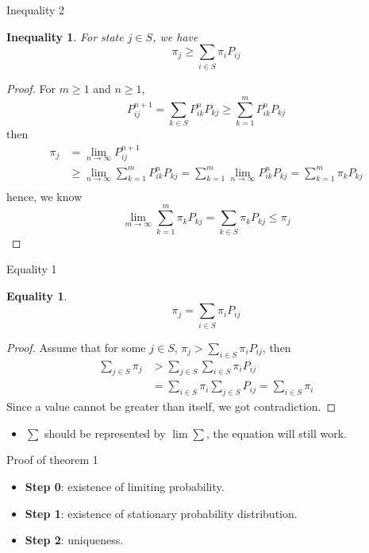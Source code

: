 \documentclass{beamer}
\newtheorem{ineq}{Inequality}
\newtheorem{eq}{Equality}
\begin{document}
\begin{frame}{Inequality 2}
	\begin{ineq}
		For state $j \in S$, we have
		\[
		\pi_j \geq \sum_{i \in S} \pi_i P_{ij}
		\]
	\end{ineq}
\end{frame}

\begin{frame}[shrink]
	\begin{proof}
		For $m \geq 1$ and $n \geq 1$,
		\[
		P^{n+1}_{ij} = \sum_{k \in S} P^n_{ik} P_{kj} \geq \sum_{k=1}^m P^n_{ik} P_{kj}
		\]
		then
		\begin{align*}
			\pi_j &= \lim_{n \to \infty} P^{n+1}_{ij} \\
			&\geq \lim_{n \to \infty} \sum_{k=1}^m P^n_{ik} P_{kj} 
			 = \sum_{k=1}^m \lim_{n \to \infty} P^n_{ik} P_{kj} 
			 = \sum_{k=1}^m \pi_k P_{kj}\\
		\end{align*}
		hence, we know
		\[
		\lim_{m\to\infty} \sum_{k=1}^m \pi_k P_{kj} = \sum_{k \in S} \pi_k P_{kj} \leq \pi_j
		\]
	\end{proof}
\end{frame}

\begin{frame}{Equality 1}
	\begin{eq}
		\[
		\pi_j = \sum_{i \in S} \pi_i P_{ij}
		\]
	\end{eq}
\end{frame}

\begin{frame}
	\begin{proof}
		Assume that for some $j \in S$,
		$\pi_j > \sum_{i \in S} \pi_i P_{ij}$, then
		\begin{align*}
			\sum_{j \in S} \pi_j &> \sum_{j \in S}\sum_{i \in S} \pi_i P_{ij} \\
			&= \sum_{i \in S} \pi_i \sum_{j \in S} P_{ij} = \sum_{i \in S} \pi_i
		\end{align*}
		Since a value cannot be greater than itself, we got contradiction.
	\end{proof}
	\begin{itemize}
		\item $\sum$ should be represented by $\lim \sum$, the equation will still work.
	\end{itemize}
\end{frame}

\begin{frame}{Proof of theorem 1}
	\begin{itemize}
		\item \textbf{Step 0}: existence of limiting probability.
		\item \textbf{Step 1}: existence of stationary probability distribution.
		\item \textbf{Step 2}: uniqueness.
	\end{itemize}
\end{frame}
\end{document}
